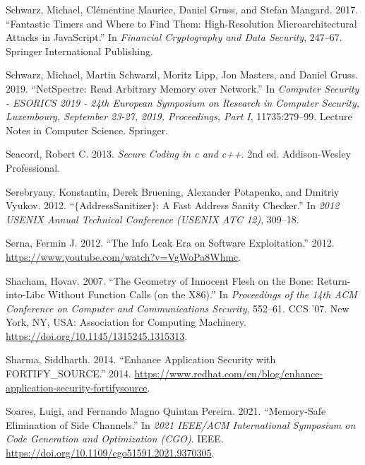 \documentclass[
  a4paper,
]{report}
\newlength{\cslhangindent}
\newlength{\cslentryspacingunit} %
\newenvironment{CSLReferences}[2] %
 {%
  \setlength{\parindent}{0pt}
  \ifodd #1
  \let\oldpar\par
  \def\par{\hangindent=\cslhangindent\oldpar}
  \fi
  \setlength{\parskip}{#2\cslentryspacingunit}
 }%
 {}
\begin{document}
\begin{CSLReferences}{1}{0}
\leavevmode{}%
Schwarz, Michael, Clémentine Maurice, Daniel Gruss, and Stefan Mangard.
2017. {``Fantastic Timers and Where to Find Them: High-Resolution
Microarchitectural Attacks in {JavaScript}.''} In \emph{Financial
Cryptography and Data Security}, 247--67. Springer International
Publishing.

\leavevmode{}%
Schwarz, Michael, Martin Schwarzl, Moritz Lipp, Jon Masters, and Daniel
Gruss. 2019. {``NetSpectre: Read Arbitrary Memory over Network.''} In
\emph{Computer Security - {ESORICS} 2019 - 24th European Symposium on
Research in Computer Security, Luxembourg, September 23-27, 2019,
Proceedings, Part {I}}, 11735:279--99. Lecture Notes in Computer
Science. Springer.

\leavevmode{}%
Seacord, Robert C. 2013. \emph{Secure Coding in c and c++}. 2nd ed.
Addison-Wesley Professional.

\leavevmode{}%
Serebryany, Konstantin, Derek Bruening, Alexander Potapenko, and Dmitriy
Vyukov. 2012. {``\(\{\)AddressSanitizer\(\}\): A Fast Address Sanity
Checker.''} In \emph{2012 USENIX Annual Technical Conference (USENIX ATC
12)}, 309--18.

\leavevmode{}%
Serna, Fermin J. 2012. {``The Info Leak Era on Software Exploitation.''}
2012. \url{https://www.youtube.com/watch?v=VgWoPa8Whmc}.

\leavevmode{}%
Shacham, Hovav. 2007. {``The Geometry of Innocent Flesh on the Bone:
Return-into-Libc Without Function Calls (on the X86).''} In
\emph{Proceedings of the 14th ACM Conference on Computer and
Communications Security}, 552--61. CCS '07. New York, NY, USA:
Association for Computing Machinery.
\url{https://doi.org/10.1145/1315245.1315313}.

\leavevmode{}%
Sharma, Siddharth. 2014. {``Enhance Application Security with
FORTIFY\_SOURCE.''} 2014.
\url{https://www.redhat.com/en/blog/enhance-application-security-fortifysource}.

\leavevmode{}%
Soares, Luigi, and Fernando Magno Quintan Pereira. 2021. {``Memory-Safe
Elimination of Side Channels.''} In \emph{2021 {IEEE}/{ACM}
International Symposium on Code Generation and Optimization ({CGO})}.
{IEEE}. \url{https://doi.org/10.1109/cgo51591.2021.9370305}.


\end{CSLReferences}
\end{document}
